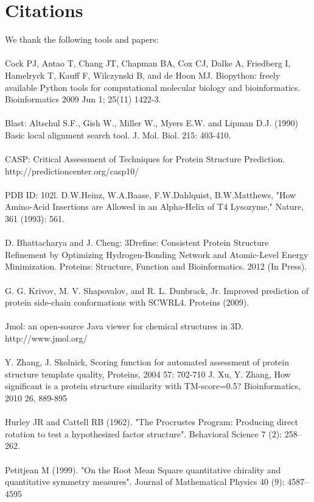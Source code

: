 \documentclass{article}
\begin{document}
\section{Citations}

We thank the following tools and papers: \\\\

Cock PJ, Antao T, Chang JT, Chapman BA, Cox CJ, Dalke A, Friedberg I, Hamelryck T, Kauff F, Wilczynski B, and de Hoon MJ. Biopython: freely available Python tools for computational molecular biology and bioinformatics. Bioinformatics 2009 Jun 1; 25(11) 1422-3.\\\\

Blast:  Altschul S.F., Gish W., Miller W., Myers E.W. and Lipman D.J. (1990)
Basic local alignment search tool.  J. Mol. Biol. 215: 403-410.\\\\

CASP: Critical Assessment of Techniques for Protein Structure Prediction.\\
http://predictioncenter.org/casp10/ \\\\

PDB ID: 102l.
D.W.Heinz, W.A.Baase, F.W.Dahlquist, B.W.Matthews, "How Amino-Acid Insertions are Allowed in an Alpha-Helix of T4 Lysozyme," Nature, 361 (1993): 561.\\\\

D. Bhattacharya and J. Cheng: 3Drefine: Consistent Protein Structure Refinement by Optimizing Hydrogen-Bonding Network and Atomic-Level Energy Minimization.
Proteins: Structure, Function and Bioinformatics. 2012 (In Press).\\\\

G. G. Krivov, M. V. Shapovalov, and R. L. Dunbrack, Jr. Improved prediction of protein side-chain conformations with SCWRL4. Proteins (2009).\\\\

Jmol: an open-source Java viewer for chemical structures in 3D. http://www.jmol.org/ \\\\

Y. Zhang, J. Skolnick, Scoring function for automated assessment of protein structure template quality, Proteins, 2004 57: 702-710
J. Xu, Y. Zhang, How significant is a protein structure similarity with TM-score=0.5? Bioinformatics, 2010 26, 889-895\\\\

Hurley JR and Cattell RB (1962). "The Procrustes Program: Producing direct rotation to test a hypothesized factor structure". Behavioral Science 7 (2): 258–262.\\\\

Petitjean M (1999). "On the Root Mean Square quantitative chirality and quantitative symmetry measures". Journal of Mathematical Physics 40 (9): 4587–4595\\\\
\end{document}
